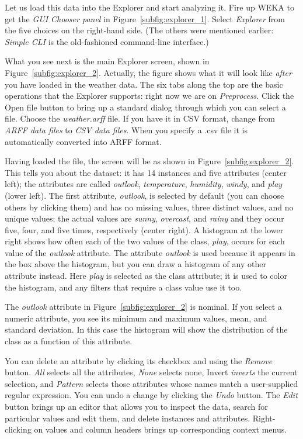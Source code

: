 Let us load this data into the Explorer and start analyzing it. Fire up
WEKA to get the \textit{GUI Chooser panel} in Figure~\ref{subfig:explorer_1}. Select
\textit{Explorer} from the five choices on the right-hand side. (The
others were mentioned earlier: \textit{Simple CLI} is the
old-fashioned command-line interface.)

What you see next is the main Explorer screen, shown in
Figure~\ref{subfig:explorer_2}. Actually, the figure shows what it will
look like \textit{after} you have loaded in the weather data. The six
tabs along the top are the basic operations that the Explorer
supports: right now we are on \textit{Preprocess}. Click the Open file
button to bring up a standard dialog through which you can select a
file. Choose the \textit{weather.arff} file. If you have it in CSV
format, change from \textit{ARFF data files} to \textit{CSV data
  files}. When you specify a .csv file it is automatically converted
into ARFF format.

Having loaded the file, the screen will be as shown in
Figure~\ref{subfig:explorer_2}. This tells you about the dataset: it
has 14 instances and five attributes (center left); the attributes are
called \textit{outlook}, \textit{temperature}, \textit{humidity},
\textit{windy}, and \textit{play} (lower left). The first attribute,
\textit{outlook}, is selected by default (you can choose others by
clicking them) and has no missing values, three distinct values, and
no unique values; the actual values are \textit{sunny},
\textit{overcast}, and \textit{rainy} and they occur five, four, and
five times, respectively (center right). A histogram at the lower
right shows how often each of the two values of the class,
\textit{play}, occurs for each value of the \textit{outlook}
attribute. The attribute \textit{outlook} is used because it appears
in the box above the histogram, but you can draw a histogram of any
other attribute instead. Here \textit{play} is selected as the class
attribute; it is used to color the histogram, and any filters that
require a class value use it too.

The \textit{outlook} attribute in Figure~\ref{subfig:explorer_2} is
nominal. If you select a numeric attribute, you see its minimum and
maximum values, mean, and standard deviation. In this case the
histogram will show the distribution of the class as a function of
this attribute.

You can delete an attribute by clicking its checkbox and using the
\textit{Remove} button. \textit{All} selects all the attributes,
\textit{None} selects none, Invert \textit{inverts} the current
selection, and \textit{Pattern} selects those attributes whose names
match a user-supplied regular expression. You can undo a change by
clicking the \textit{Undo} button. The \textit{Edit} button brings up
an editor that allows you to inspect the data, search for particular
values and edit them, and delete instances and
attributes. Right-clicking on values and column headers brings up
corresponding context menus.

